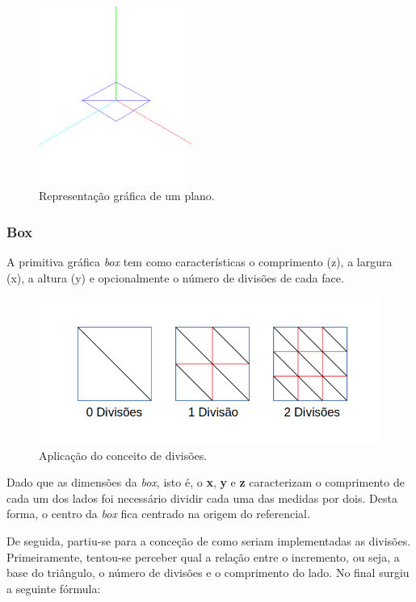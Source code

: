\documentclass[a4paper]{article}
\begin{document}
\begin{figure}[h!]
\centering
\includegraphics[width=5cm]{./imagens/plane.png}
\caption{Representação gráfica de um plano.}
\label{fig:plane}
\end{figure}

\subsubsection{Box} %

\hspace{8mm} A primitiva gráfica \textit{box} tem como características o comprimento (z), a largura (x), a altura (y) e opcionalmente o número de divisões de cada face.

\begin{figure}[h!]
\centering
\includegraphics[width=12cm]{./imagens/divisions.png}
\caption{Aplicação do conceito de divisões.}
\label{fig:divisions}
\end{figure}

\hspace{3mm} Dado que as dimensões da \textit{box}, isto é, o \textbf{x}, \textbf{y} e \textbf{z} caracterizam o comprimento de cada um dos lados foi necessário dividir cada uma das medidas por dois. Desta forma, o centro da \textit{box} fica centrado na origem do referencial.

\hspace{3mm} De seguida, partiu-se para a conceção de como seriam implementadas as divisões. Primeiramente, tentou-se perceber qual a relação entre o incremento, ou seja, a base do triângulo, o número de divisões e o comprimento do lado. No final surgiu a seguinte fórmula:
\end{document}
